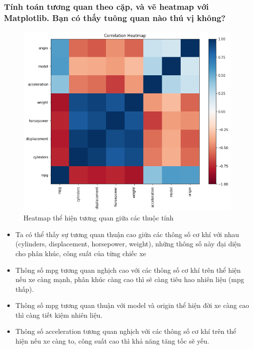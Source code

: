 \documentclass[a4paper, 12pt]{article}
\begin{document}
    \subsubsection{Tính toán tương quan theo cặp, và vẽ heatmap với Matplotlib. Bạn có thấy tuông quan nào thú vị không?}
        \begin{figure}[H]
            \centering
                \includegraphics[scale=0.5]{img/heatmap.png}
                \caption{Heatmap thể hiện tương quan giữa các thuộc tính}
        \end{figure}
        
        \begin{itemize}
            \item Ta có thể thấy sự tương quan thuận cao giữa các thông số cơ khí với nhau (cylinders, displacement, horsepower, weight), những thông số này đại diện cho phân khúc, công suất của từng chiếc xe
            \item Thông số mpg tương quan nghịch cao với các thông số cơ khí trên thể hiện nếu xe càng mạnh, phân khúc càng cao thì sẽ càng tiêu hao nhiên liệu (mpg thấp).
            \item Thông số mpg tương quan thuận với model và origin thể hiện đời xe càng cao thì càng tiết kiệm nhiên liệu.
            \item Thông số acceleration tương quan nghịch với các thông số cơ khí trên thể hiện nếu xe càng to, công suất cao thì khả năng tăng tốc sẽ yếu.
        \end{itemize}
        
\end{document}
